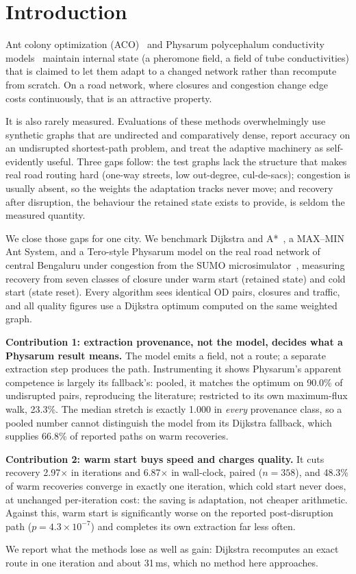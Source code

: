 \section{Introduction}

Ant colony optimization (ACO)~\cite{dorigo1996ant,stutzle2000maxmin} and
Physarum polycephalum conductivity
models~\cite{nakagaki2000maze,tero2007mathematical} maintain internal state (a pheromone field, a field of tube conductivities)
that is claimed to
let them adapt to a changed network rather than recompute from scratch. On a
road network, where closures and congestion change edge costs continuously,
that is an attractive property.

It is also rarely measured. Evaluations of these methods overwhelmingly use
synthetic graphs that are undirected and comparatively dense, report accuracy
on an undisrupted shortest-path problem, and treat the adaptive machinery as
self-evidently useful. Three gaps follow: the test graphs lack the structure
that makes real road routing hard (one-way streets, low out-degree,
cul-de-sacs); congestion is usually absent, so the weights the adaptation
tracks never move; and recovery after disruption, the behaviour the retained state exists to
provide, is seldom the measured quantity.

We close those gaps for one city. We benchmark Dijkstra and
A*~\cite{dijkstra1959note,hart1968formal}, a MAX--MIN Ant System, and a
Tero-style Physarum model on the real road network of central Bengaluru
under congestion from the SUMO microsimulator~\cite{lopez2018microscopic},
measuring recovery from seven classes of closure under warm start (retained
state) and cold start (state reset). Every algorithm sees identical OD
pairs, closures and traffic, and all quality figures use a Dijkstra optimum
computed on the same weighted graph.

\textbf{Contribution 1: extraction provenance, not the model, decides what a
Physarum result means.} The model emits a field, not a route; a separate
extraction step produces the path. Instrumenting it shows Physarum's apparent
competence is largely its fallback's: pooled, it matches the optimum on
90.0\% of undisrupted pairs, reproducing the literature; restricted to its
own maximum-flux walk, 23.3\%. The median stretch is exactly 1.000 in
\emph{every} provenance class, so a pooled number cannot distinguish the
model from its Dijkstra fallback, which supplies 66.8\% of reported paths on
warm recoveries.

\textbf{Contribution 2: warm start buys speed and charges quality.} It cuts
recovery 2.97$\times$ in iterations and 6.87$\times$ in wall-clock, paired
($n=358$), and 48.3\% of warm recoveries converge in exactly one iteration,
which cold start never does, at unchanged per-iteration cost: the saving is
adaptation, not cheaper arithmetic. Against this, warm start is significantly
worse on the reported post-disruption path ($p=4.3\times10^{-7}$) and
completes its own extraction far less often.

We report what the methods lose as well as gain: Dijkstra recomputes an exact
route in one iteration and about 31\,ms, which no method here approaches.
